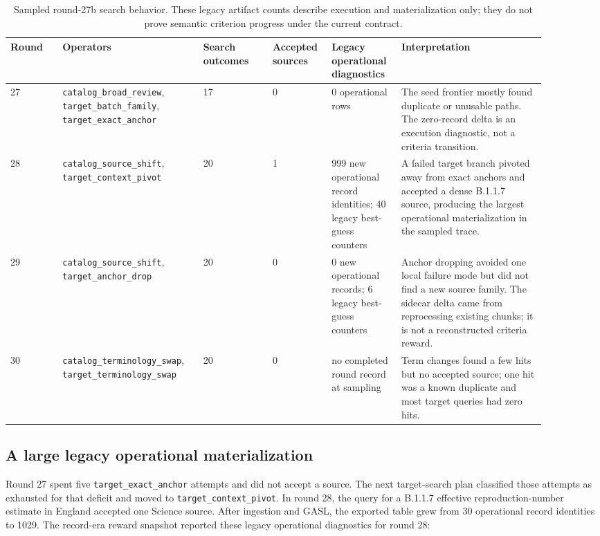 \documentclass[11pt]{article}
\newcommand{\action}[1]{\texttt{#1}}
\begin{document}
\begin{table}[htbp]
\centering
\small
\begin{tabular}{@{}p{0.09\linewidth}p{0.22\linewidth}p{0.12\linewidth}p{0.10\linewidth}p{0.12\linewidth}p{0.25\linewidth}@{}}
\toprule
Round & Operators & Search outcomes & Accepted sources & Legacy operational diagnostics & Interpretation \\
\midrule
27 &
\action{catalog\_broad\_review}, \action{target\_batch\_family},
\action{target\_exact\_anchor} &
17 & 0 & 0 operational rows &
The seed frontier mostly found duplicate or unusable paths.  The zero-record
delta is an execution diagnostic, not a criteria transition. \\
28 &
\action{catalog\_source\_shift}, \action{target\_context\_pivot} &
20 & 1 & 999 new operational record identities; 40 legacy best-guess counters &
A failed target branch pivoted away from exact anchors and accepted a dense
B.1.1.7 source, producing the largest operational materialization in the
sampled trace. \\
29 &
\action{catalog\_source\_shift}, \action{target\_anchor\_drop} &
20 & 0 & 0 new operational records; 6 legacy best-guess counters &
Anchor dropping avoided one local failure mode but did not find a new source
family.  The sidecar delta came from reprocessing existing chunks; it is not a
reconstructed criteria reward. \\
30 &
\action{catalog\_terminology\_swap}, \action{target\_terminology\_swap} &
20 & 0 & no completed round record at sampling &
Term changes found a few hits but no accepted source; one hit was a known
duplicate and most target queries had zero hits. \\
\bottomrule
\end{tabular}
\caption{Sampled round-27b search behavior.  These legacy artifact counts
describe execution and materialization only; they do not prove semantic
criterion progress under the current contract.}
\label{tab:round27b}
\end{table}

\subsection{A large legacy operational materialization}

Round 27 spent five \action{target\_exact\_anchor} attempts and did not accept
a source.  The next target-search plan classified those attempts as exhausted
for that deficit and moved to \action{target\_context\_pivot}.  In round 28,
the query for a B.1.1.7 effective reproduction-number estimate in England
accepted one Science source.  After ingestion and GASL, the exported table grew
from 30 operational record identities to 1029.  The record-era reward snapshot
reported these legacy operational diagnostics for round 28:
\end{document}
